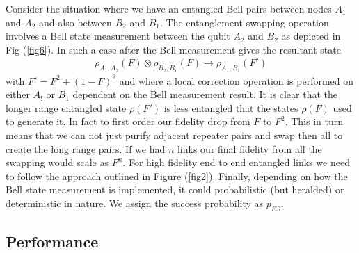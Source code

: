 \documentclass[twocolumn, aps, rmp, amsmath, amssymb, nofootinbib, superscriptaddress, longbibliography, floatfix, table-of-contents, eqsecnum]{revtex4-1}
\begin{document}
Consider the situation where we have an entangled Bell pairs between nodes $A_1$ and $A_2$ and also between $B_2$ and $B_1$. The entanglement swapping operation involves a Bell state measurement between the qubit $A_2$ and $B_2$ as depicted in Fig (\ref{fig6}).  In such a case after the Bell measurement gives the resultant state 
\begin{align}
\rho_{A_1,A_2} (F)\otimes \rho_{B_2,B_1}(F)\rightarrow \rho_{A_1,B_1} (F')
\end{align}
with $F'=F^2+(1-F)^2$ and where a local correction operation is performed on either $A_!$ or $B_1$ dependent on the Bell measurement result. It is clear that the longer range entangled state $\rho (F')$ is less entangled that the states $\rho (F)$ used to generate it. In fact to first order our fidelity drop from $F$ to $F^2$. This in turn means that we can not just purify adjacent repeater pairs and swap then all to create the long range pairs. If we had $n$ links our final fidelity from all the swapping would scale as $F^n$. For high fidelity end to end entangled links we need to follow the approach outlined in Figure (\ref{fig2}). Finally, depending on how the Bell state measurement is implemented, it could probabilistic (but heralded) or deterministic in nature. We assign the success probability as $p_{ES}$.

\subsection{Performance}
\end{document}
